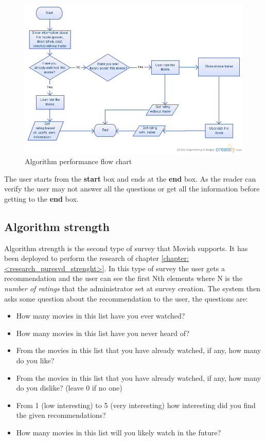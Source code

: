 \begin{figure}
  \centering
  \includegraphics[width=\textwidth]{figures/algorithm_performance_flow_chart.png}
  \caption{Algorithm performance flow chart}
  \label{fig:algorithm_performance_flow_chart}
\end{figure}

The user starts from the \textbf{start} box and ends at the \textbf{end} box. As the reader can verify the user may not answer all the questions or get all the information before getting to the \textbf{end} box.

\subsection{Algorithm strength}
\label{sec:algorithm_strenght}

Algorithm strength is the second type of survey that Movish supports. It has been deployed to perform the research of chapter \ref{chapter:<research_puresvd_strenght>}. In this type of survey the user gets a recommendation and the user can see the first Nth elements where N is the \textit{number of ratings} that the administrator set at survey creation. The system then asks some question about the recommendation to the user, the questions are:

\begin{itemize}
\item How many movies in this list have you ever watched?
\item How many movies in this list have you never heard of?
\item From the movies in this list that you have already watched, if any, how many do you like?
\item From the movies in this list that you have already watched, if any, how many do you dislike? (leave 0 if no one)
\item From 1 (low interesting) to 5 (very interesting) how interesting did you find the given recommendations?
\item How many movies in this list will you likely watch in the future?
\end{itemize}

